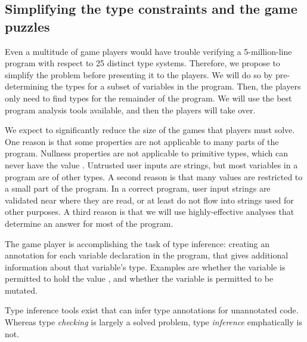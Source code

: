 \documentclass[preprint]{sig-alternate}
\def\<#1>{\codeid{#1}}
\newcommand{\codeid}[1]{\ifmmode{\mbox{\ttfamily{#1}}}\else{\ttfamily #1}\fi}
\begin{document}
\subsection{Simplifying the type constraints and the game puzzles}
\label{sec:simplification}

Even a multitude of game players would have trouble verifying a
5-million-line program with respect to 25 distinct type systems.
Therefore, we propose to simplify the problem before presenting it to the
players.  We will do so by pre-determining the types for a subset of
variables in the program.  Then, the players only need to find types for
the remainder of the program.  We will use the best program analysis tools
available, and then the players will take over.

We expect to significantly reduce the size of the games that players must
solve.  One reason is that some properties are not applicable to many parts
of the program.  Nullness properties are not applicable to primitive types,
which can never have the value \<null>.  Untrusted user inputs are strings,
but most variables in a program are of other types.  A second reason is
that many values are restricted to a small part of the program.  In a
correct program, user input strings are validated near where they are read,
or at least do not flow into strings used for other purposes.  A third
reason is that we will use highly-effective analyses that determine an
answer for most of the program.

The game player is accomplishing the task of type inference:  creating an
annotation for each variable declaration in the program, that gives
additional information about that variable's type.  Examples are whether
the variable is permitted to hold the value \<null>, and whether the
variable is permitted to be mutated.

Type inference tools exist that can infer type annotations for unannotated
code.  Whereas type \emph{checking} is largely a solved problem, type
\emph{inference} emphatically is not.
\end{document}
